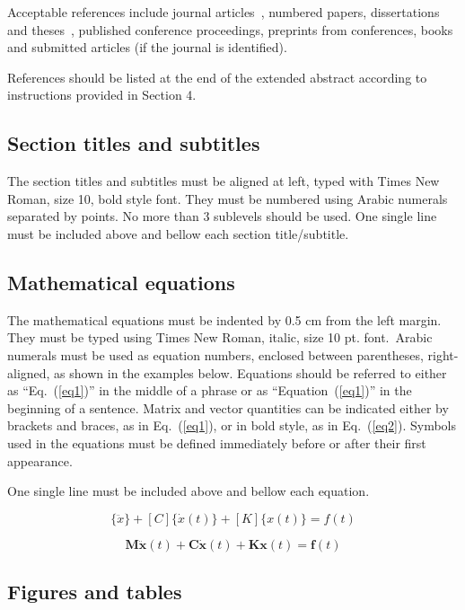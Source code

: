 Acceptable references include journal articles~\citet{Villani2004}, numbered papers, dissertations and theses~\citep{Machado2011}, published conference proceedings, preprints from conferences, books~\citep{Miyagi1996} and submitted articles (if the journal is identified).

References should be listed at the end of the extended abstract according to instructions provided in Section 4.

\subsection{Section titles and subtitles}

The section titles and subtitles must be aligned at left, typed with Times New Roman, size 10, bold style font. They must be numbered using Arabic numerals separated by points. No more than 3 sublevels should be used. One single line must be included above and bellow each section title/subtitle.

\subsection{Mathematical equations}

The mathematical equations must be indented by 0.5 cm from the left margin. They must be typed using Times New Roman, italic, size 10 pt. font.\ Arabic numerals must be used as equation numbers, enclosed between parentheses, right-aligned, as shown in the examples below. Equations should be referred to either as ``Eq.~(\ref{eq1})'' in the middle of a phrase or as ``Equation~(\ref{eq1})'' in the beginning of a sentence. Matrix and vector quantities can be indicated either by brackets and braces, as in Eq.~(\ref{eq1}), or in bold style, as in Eq.~(\ref{eq2}). Symbols used in the equations must be defined immediately before or after their first appearance.

One single line must be included above and bellow each equation.

\begin{equation}
[M]\{\ddot{x}\}+[C]\{\dot{x}(t)\}+[K]\{x(t)\}={f(t)}
\label{eq1}
\end{equation}

\begin{equation}
\mathbf{M\ddot{x}}(t)+\mathbf{C\dot{x}}(t)+\mathbf{Kx}(t)=\mathbf{f}(t)
\label{eq2}
\end{equation}

\subsection{Figures and tables}

